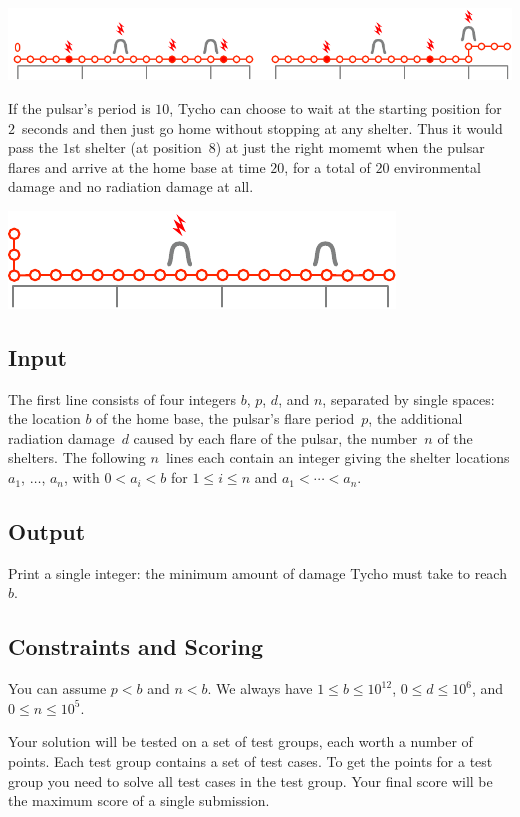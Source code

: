 \includegraphics[width=.8\textwidth]{img/sample1_2.pdf}

If the pulsar's period is $10$, Tycho can choose to wait at the starting position for $2$~seconds and then just go home without stopping at any shelter.
Thus it would pass the $1$st shelter (at position~$8$) at just the right momemt when the pulsar flares and arrive at the home base at time $20$, for a total of $20$ environmental damage and no radiation damage at all.

\includegraphics[width=.4\textwidth]{img/sample3.pdf}

\subsection*{Input}

The first line consists of four integers $b$, $p$, $d$, and $n$, separated by single spaces:
the location $b$ of the home base,
the pulsar's flare period~$p$,
the additional radiation damage~$d$ caused by each flare of the pulsar,
the number~$n$ of the shelters.
The following $n$~lines each contain an integer giving the shelter locations $a_1$, $\ldots$, $a_n$, with 
$0<a_i< b$ for $1\leq i \leq n$ %
and 
$a_1<\cdots <a_n$. %

\subsection*{Output}

Print a single integer: the minimum amount of damage Tycho must take to reach $b$.

\subsection*{Constraints and Scoring}

You can assume
$p < b$ %
and
$n < b$. %
We always have
$1\leq b\leq 10^{12}$, %
$0\leq d \leq 10^6$, %
and
$0\leq n \leq 10^5$. %

Your solution will be tested on a set of test groups, each worth a number of points.
Each test group contains a set of test cases.
To get the points for a test group you need to solve all test cases in the test group.
Your final score will be the maximum score of a single submission.

